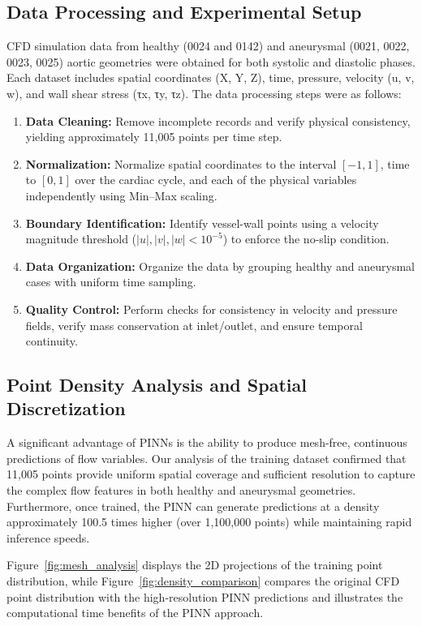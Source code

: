 \documentclass[12pt, a4paper]{article}
\begin{document}
\subsection{Data Processing and Experimental Setup}
\label{sec:data_processing}
CFD simulation data from healthy (0024 and 0142) and aneurysmal (0021, 0022, 0023, 0025) aortic geometries were obtained for both systolic and diastolic phases. Each dataset includes spatial coordinates (X, Y, Z), time, pressure, velocity (u, v, w), and wall shear stress (τx, τy, τz). The data processing steps were as follows:
\begin{enumerate}
    \item \textbf{Data Cleaning:} Remove incomplete records and verify physical consistency, yielding approximately 11,005 points per time step.
    \item \textbf{Normalization:} Normalize spatial coordinates to the interval \([-1,1]\), time to \([0,1]\) over the cardiac cycle, and each of the physical variables independently using Min--Max scaling.
    \item \textbf{Boundary Identification:} Identify vessel-wall points using a velocity magnitude threshold ($|u|, |v|, |w| < 10^{-5}$) to enforce the no-slip condition.
    \item \textbf{Data Organization:} Organize the data by grouping healthy and aneurysmal cases with uniform time sampling.
    \item \textbf{Quality Control:} Perform checks for consistency in velocity and pressure fields, verify mass conservation at inlet/outlet, and ensure temporal continuity.
\end{enumerate}

\subsection{Point Density Analysis and Spatial Discretization}
A significant advantage of PINNs is the ability to produce mesh-free, continuous predictions of flow variables. Our analysis of the training dataset confirmed that 11,005 points provide uniform spatial coverage and sufficient resolution to capture the complex flow features in both healthy and aneurysmal geometries. Furthermore, once trained, the PINN can generate predictions at a density approximately 100.5 times higher (over 1,100,000 points) while maintaining rapid inference speeds.

Figure~\ref{fig:mesh_analysis} displays the 2D projections of the training point distribution, while Figure~\ref{fig:density_comparison} compares the original CFD point distribution with the high-resolution PINN predictions and illustrates the computational time benefits of the PINN approach.
\end{document}
